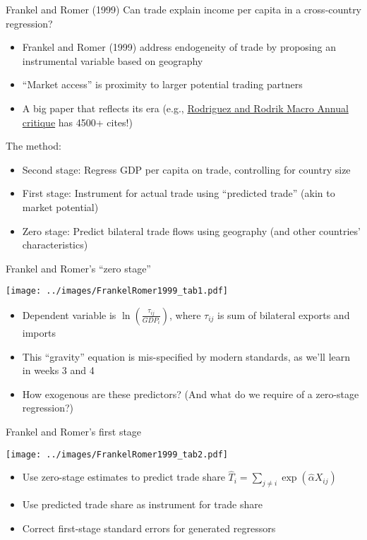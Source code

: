 \documentclass[10pt,notes=hide]{beamer}
\begin{document}
\begin{frame}{Frankel and Romer (1999)}
Can trade explain income per capita in a cross-country regression?
\begin{itemize}
	\item Frankel and Romer (1999) address endogeneity of trade by proposing an instrumental variable based on geography
	\item ``Market access'' is proximity to larger potential trading partners
	\item A big paper that reflects its era (e.g., \href{https://www.journals.uchicago.edu/doi/abs/10.1086/654419}{Rodriguez and Rodrik Macro Annual critique} has 4500+ cites!)
\end{itemize}
The method:
\begin{itemize}
	\item Second stage: Regress GDP per capita on trade, controlling for country size
	\item First stage: Instrument for actual trade using ``predicted trade'' (akin to market potential)
	\item Zero stage: Predict bilateral trade flows using geography (and other countries' characteristics)
\end{itemize}
\end{frame}
\begin{frame}{Frankel and Romer's ``zero stage''}
\begin{minipage}{0.49\textwidth}
\texttt{[image: ../images/FrankelRomer1999\_tab1.pdf]}
\end{minipage}
\begin{minipage}{0.49\textwidth}
\begin{itemize}
	\item Dependent variable is $\ln\left(\frac{\tau_{ij}}{GDP_i}\right)$, where $\tau_{ij}$ is sum of bilateral exports and imports
	\item This ``gravity'' equation is mis-specified by modern standards, as we'll learn in weeks 3 and 4
	\item How exogenous are these predictors? (And what do we require of a zero-stage regression?)
\end{itemize}
\end{minipage}
\end{frame}
\begin{frame}{Frankel and Romer's first stage}
\begin{minipage}{0.59\textwidth}
\texttt{[image: ../images/FrankelRomer1999\_tab2.pdf]}
\end{minipage}
\begin{minipage}{0.39\textwidth}
\begin{itemize}
	\item Use zero-stage estimates to predict trade share $\hat{T}_i = \sum_{j \neq i} \exp\left(\hat{\alpha} X_{ij}\right)$
	\item Use predicted trade share as instrument for trade share
	\item Correct first-stage standard errors for generated regressors
\end{itemize}
\end{minipage}
\end{frame}
\end{document}
